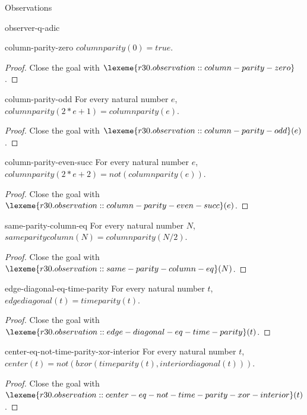 \begin{lexlean}{Observations}
\begin{section}{observer-q-adic}
\begin{theorem}{column-parity-zero}
\(columnparity(0) = true\).
\begin{proof}
Close the goal with \(\lexeme{r30.observation::column-parity-zero}\).
\end{proof}
\end{theorem}

\begin{theorem}{column-parity-odd}
For every natural number \(e\), \(columnparity(2 * e + 1) = columnparity(e)\).
\begin{proof}
Close the goal with \(\lexeme{r30.observation::column-parity-odd}(e)\).
\end{proof}
\end{theorem}

\begin{theorem}{column-parity-even-succ}
For every natural number \(e\), \(columnparity(2 * e + 2) = not(columnparity(e))\).
\begin{proof}
Close the goal with \(\lexeme{r30.observation::column-parity-even-succ}(e)\).
\end{proof}
\end{theorem}

\begin{theorem}{same-parity-column-eq}
For every natural number \(N\), \(sameparitycolumn(N) = columnparity(N / 2)\).
\begin{proof}
Close the goal with \(\lexeme{r30.observation::same-parity-column-eq}(N)\).
\end{proof}
\end{theorem}

\begin{theorem}{edge-diagonal-eq-time-parity}
For every natural number \(t\), \(edgediagonal(t) = timeparity(t)\).
\begin{proof}
Close the goal with \(\lexeme{r30.observation::edge-diagonal-eq-time-parity}(t)\).
\end{proof}
\end{theorem}

\begin{theorem}{center-eq-not-time-parity-xor-interior}
For every natural number \(t\), \(center(t) = not(bxor(timeparity(t), interiordiagonal(t)))\).
\begin{proof}
Close the goal with \(\lexeme{r30.observation::center-eq-not-time-parity-xor-interior}(t)\).
\end{proof}
\end{theorem}


\end{section}
\end{lexlean}
